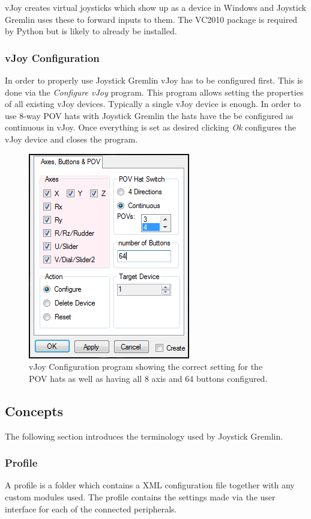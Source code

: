 \documentclass[a4, 10pt]{article}
\newcommand{\JG}{Joystick Gremlin}
\begin{document}
vJoy creates virtual joysticks which show up as a device in Windows and
\JG{} uses these to forward inputs to them. The VC2010 package is
required by Python but is likely to already be installed.

\subsubsection{vJoy Configuration}

In order to properly use \JG{} vJoy has to be configured first. This is
done via the \emph{Configure vJoy} program. This program allows setting
the properties of all existing vJoy devices. Typically a single vJoy
device is enough. In order to use 8-way POV hats with \JG{} the hats
have the be configured as continuous in vJoy. Once everything is set as
desired clicking \emph{Ok} configures the vJoy device and closes the
program.

\begin{figure}[bt]
    \centering

    \includegraphics[width=0.5\linewidth]{images/vjoy_configuration}
    \caption{vJoy Configuration program showing the correct setting for
        the POV hats as well as having all 8 axis and 64 buttons
        configured.}
\end{figure}


\subsection{Concepts}
\label{sec:concepts}

The following section introduces the terminology used by \JG{}.


\subsubsection{Profile}
A profile is a folder which contains a XML configuration file together
with any custom modules used. The profile contains the settings made via
the user interface for each of the connected peripherals.
\end{document}
